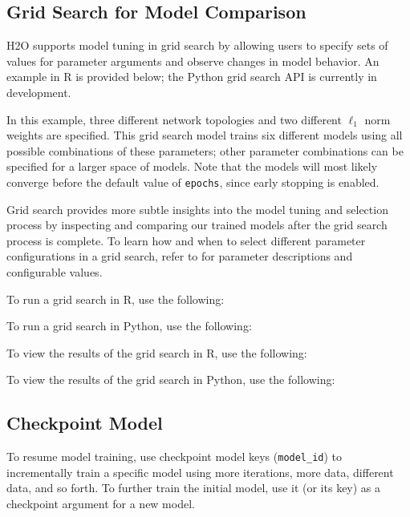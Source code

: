 {{\subsection{Grid Search for Model Comparison} 
\label{ssec:GridSearch}

H2O supports model tuning in  grid search by allowing users to specify sets of values for parameter arguments and observe changes in model behavior. An example in R is provided below; the Python grid search API is currently in development.   

In this example, three different network topologies and two different $\ell_1$ norm weights are specified. This grid search model trains six different models using all possible combinations of these parameters; other parameter combinations can be specified for a larger space of models. Note that the models will most likely converge before the default value of \texttt{epochs}, since early stopping is enabled.

Grid search provides more subtle insights into the model tuning and selection process by inspecting and comparing our trained models after the grid search process is complete. To learn how and when to select different parameter configurations in a grid search, refer to {\textbf{}} for parameter descriptions and configurable values. 

\waterExampleInR
To run a grid search in R, use the following:


\newpage
\waterExampleInPython
To run a grid search in Python, use the following:


\normalsize
\noindent
\waterExampleInR
To view the results of the grid search in R, use the following: 


\medskip
\waterExampleInPython
To view the results of the grid search in Python, use the following: 



\subsection{Checkpoint Model}

To resume model training, use checkpoint model keys (\texttt{model\_id}) to incrementally train a specific model using more iterations, more data, different data, and so forth. To further train the initial model, use it (or its key) as a checkpoint argument for a new model.

}}
